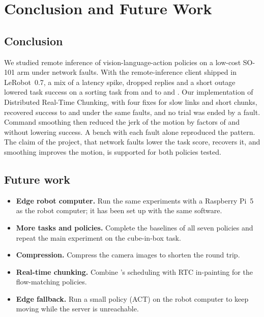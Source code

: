 \chapter{Conclusion and Future Work}\label{ch:conclusion}

\section{Conclusion}

We studied remote inference of vision-language-action policies on a low-cost SO-101 arm under network faults. With
the remote-inference client shipped in LeRobot~0.7, a mix of a latency spike, dropped replies and a short outage lowered
task success on a sorting task from  and  to
 and . Our implementation of Distributed Real-Time Chunking, with four
fixes for slow links and short chunks, recovered success to  and  under
the same faults, and no trial was ended by a fault. Command smoothing then reduced the jerk of the motion by factors
of  and  without lowering success. A bench with each fault alone
reproduced the pattern. The claim of the project, that network faults lower the task score, \drtc{} recovers it, and
smoothing improves the motion, is supported for both policies tested.

\section{Future work}

\begin{itemize}
\item \textbf{Edge robot computer.} Run the same experiments with a Raspberry Pi~5 as the robot computer; it has been
      set up with the same software.
\item \textbf{More tasks and policies.} Complete the baselines of all seven policies and repeat the main experiment on
      the cube-in-box task.
\item \textbf{Compression.} Compress the camera images to shorten the round trip.
\item \textbf{Real-time chunking.} Combine \drtc's scheduling with RTC in-painting for the flow-matching policies.
\item \textbf{Edge fallback.} Run a small policy (ACT) on the robot computer to keep moving while the server is
      unreachable.
\end{itemize}
